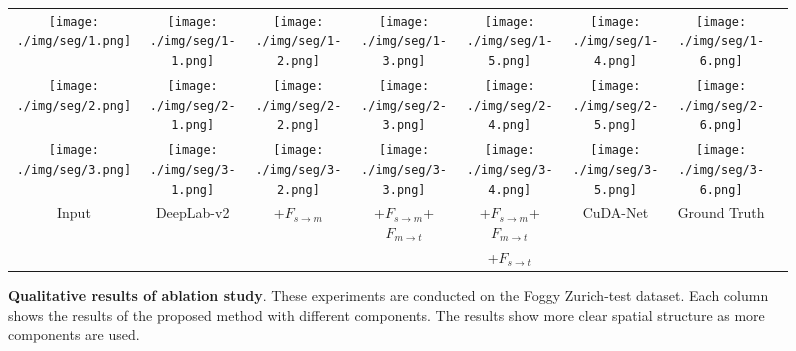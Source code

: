 \documentclass[10pt,twocolumn,letterpaper]{article}
\def\model{F}
\def\imd{m}
\def\td{t}
\begin{document}
\begin{figure*}[!ht]
\centering
		\tabcolsep=0.5pt
		\renewcommand\arraystretch{0.5}
		\begin{tabular}{cccccccc}
			\texttt{[image: ./img/seg/1.png]} &
			\texttt{[image: ./img/seg/1-1.png]} &
			\texttt{[image: ./img/seg/1-2.png]} &
			\texttt{[image: ./img/seg/1-3.png]} &
			\texttt{[image: ./img/seg/1-5.png]} &
			\texttt{[image: ./img/seg/1-4.png]} &
			\texttt{[image: ./img/seg/1-6.png]}\\
			\texttt{[image: ./img/seg/2.png]} &
			\texttt{[image: ./img/seg/2-1.png]} &
			\texttt{[image: ./img/seg/2-2.png]} &
			\texttt{[image: ./img/seg/2-3.png]} &
			\texttt{[image: ./img/seg/2-4.png]} &
			\texttt{[image: ./img/seg/2-5.png]} &
			\texttt{[image: ./img/seg/2-6.png]}\\
			\texttt{[image: ./img/seg/3.png]} &
			\texttt{[image: ./img/seg/3-1.png]} &
			\texttt{[image: ./img/seg/3-2.png]} &
			\texttt{[image: ./img/seg/3-3.png]} &
			\texttt{[image: ./img/seg/3-4.png]} &
			\texttt{[image: ./img/seg/3-5.png]} &
			\texttt{[image: ./img/seg/3-6.png]}\\
			Input & DeepLab-v2 & 
			\small{+$\model_{s \rightarrow \imd}$} & \small{+$\model_{s \rightarrow \imd}$+$\model_{\imd \rightarrow \td}$} & \small{+$\model_{s \rightarrow \imd}$+$\model_{\imd \rightarrow \td}$} & CuDA-Net  & Ground Truth \\
			\scriptsize{} & \scriptsize{} & 
			\scriptsize{} & \scriptsize{} & \small{+$\model_{s \rightarrow \td}$} 
			& \scriptsize{} & \scriptsize{} \\
	\end{tabular}
	\vspace{-2mm}
	\caption{
\textbf{Qualitative results of ablation study}.
	These experiments are conducted on the Foggy Zurich-test dataset. Each column shows the results of the proposed method with different components. 
	The results show more clear spatial structure as more components are used.}
	\vspace{-4mm}
	\label{fig:ablation}
\end{figure*}
\end{document}

